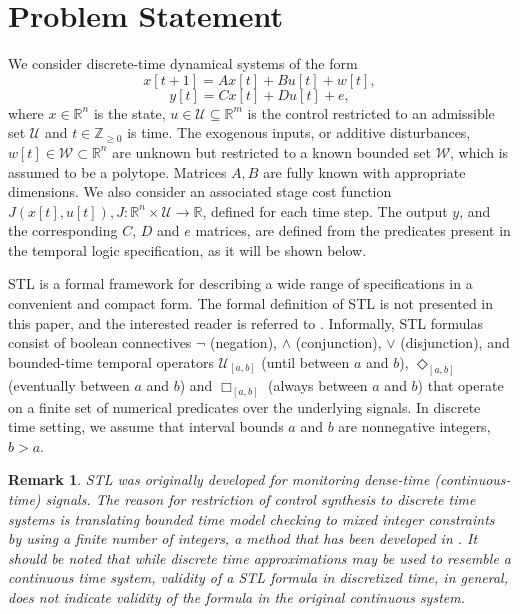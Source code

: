 \documentclass[letterpaper, 10 pt, conference]{ieeeconf}
\newtheorem{remark}{Remark}
\begin{document}
\section{Problem Statement}
\label{sec:problem}
We consider discrete-time dynamical systems of the form
\begin{equation}
\label{eq:dynamics}
x[t+1]=Ax[t]+Bu[t]+w[t],
\end{equation}
\begin{equation}
y[t]=Cx[t]+Du[t]+e,
\label{eq:secondary_signals}
\end{equation}
where $x \in \mathbb{R}^n $ is the state, $u \in \mathcal{U} \subseteq \mathbb{R}^m$ is the control restricted to an admissible set
$\mathcal{U}$ and $t \in \mathbb{Z}_{\ge 0}$ is time. The exogenous inputs, or additive disturbances, $w[t] \in \mathcal{W} \subset \mathbb{R}^n$ are unknown but restricted to a known bounded set $\mathcal{W}$, which is assumed to be a polytope. Matrices $A,B$ are fully known with appropriate dimensions. We also consider an associated stage cost function $J(x[t],u[t]), J:\mathbb{R}^n \times \mathcal{U} \rightarrow \mathbb{R}$, defined for each time step. The output $y$, and the corresponding $C$, $D$ and $e$ matrices, are defined from the predicates present in the temporal logic specification, as it will be shown below. 


STL is a formal framework for describing a wide range of specifications in a convenient and compact form. The formal definition of STL is not presented in this paper, and the interested reader is referred to \cite{maler_stl,donze}. Informally, STL formulas consist of boolean connectives $\neg$ (negation), $\wedge$ (conjunction), $\vee$ (disjunction), and bounded-time temporal operators  $\mathcal{U}_{[a,b]}$ (until between $a$ and $b$), $\Diamond_{[a,b]}$ (eventually between $a$ and $b$) and $\Box_{[a,b]}$ (always between $a$ and $b$) that operate on a finite set of numerical predicates over the underlying signals. In discrete time setting, we assume that interval bounds $a$ and $b$ are nonnegative integers, $b > a$.

\begin{remark}
STL was originally developed for monitoring dense-time (continuous-time) signals. The reason for restriction of control synthesis to discrete time systems is translating bounded time model checking to mixed integer constraints by using a finite number of integers, a method that has been developed in \cite{raman}. It should be noted that while discrete time approximations may be used to resemble a continuous time system, validity of a STL formula in discretized time, in general, does not indicate validity of the formula in the original continuous system. 
\end{remark}
\end{document}

